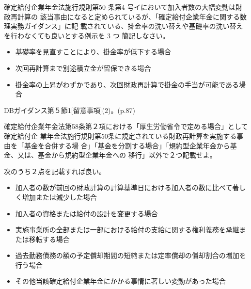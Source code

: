 \begin{shortanswer}[年金2 2021 問題2(1)]
  確定給付企業年金法施行規則第50 条第4 号イにおいて加入者数の大幅変動は財政再計算の
該当事由になると定められているが、「確定給付企業年金に関する数理実務ガイダンス」に記
載されている、掛金率の洗い替えや基礎率の洗い替えを行わなくても良いとする例示を 3 つ
簡記しなさい。
\end{shortanswer}

\begin{answerbox}
  \begin{itemize}
    \item 基礎率を見直すことにより、掛金率が低下する場合
    \item 次回再計算まで別途積立金が留保できる場合
    \item 掛金率の上昇がわずかであり、次回財政再計算で掛金の手当が可能である場合
  \end{itemize}
\end{answerbox}

\begin{explanationbox}
  DBガイダンス第５節1[留意事項](2)。(p.87)
\end{explanationbox}

\begin{shortanswer}[数理人試験 2023 問題4 設問2]
  確定給付企業年金法第58条第２項における「厚生労働省令で定める場合」として確定給付企
業年金法施行規則第50条に規定されている財政再計算を実施する事由を「基金を合併する場
合」「基金を分割する場合」「規約型企業年金から基金、又は、基金から規約型企業年金への
移行」以外で２つ記載せよ。
\end{shortanswer}

\begin{answerbox}
  次のうち２点を記載すれば良い。
  \begin{itemize}
    \item 加入者の数が前回の財政計算の計算基準日における加入者の数に比べて著しく増加または減少した場合
    \item 加入者の資格または給付の設計を変更する場合
    \item 実施事業所の全部または一部における給付の支給に関する権利義務を承継または移転する場合
    \item 過去勤務債務の額の予定償却期間の短縮または定率償却の償却割合の増加を行う場合
    \item その他当該確定給付企業年金にかかる事情に著しい変動があった場合
  \end{itemize}
\end{answerbox}

